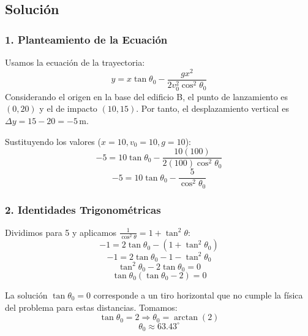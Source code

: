 \documentclass[12pt, a4paper]{article}
\begin{document}
\begin{center}
\end{center}

\subsection*{Solución}

\subsubsection*{1. Planteamiento de la Ecuación}
Usamos la ecuación de la trayectoria:
$$ y = x \tan\theta_0 - \frac{g x^2}{2 v_0^2 \cos^2\theta_0} $$
Considerando el origen en la base del edificio B, el punto de lanzamiento es $(0, 20)$ y el de impacto $(10, 15)$. Por tanto, el desplazamiento vertical es $\Delta y = 15 - 20 = -5\,\text{m}$.

Sustituyendo los valores ($x=10, v_0=10, g=10$):
$$ -5 = 10 \tan\theta_0 - \frac{10(100)}{2(100)\cos^2\theta_0} $$
$$ -5 = 10 \tan\theta_0 - \frac{5}{\cos^2\theta_0} $$

\subsubsection*{2. Identidades Trigonométricas}
Dividimos para 5 y aplicamos $\frac{1}{\cos^2\theta} = 1 + \tan^2\theta$:
$$ -1 = 2\tan\theta_0 - (1 + \tan^2\theta_0) $$
$$ -1 = 2\tan\theta_0 - 1 - \tan^2\theta_0 $$
$$ \tan^2\theta_0 - 2\tan\theta_0 = 0 $$
$$ \tan\theta_0 (\tan\theta_0 - 2) = 0 $$

La solución $\tan\theta_0 = 0$ corresponde a un tiro horizontal que no cumple la física del problema para estas distancias. Tomamos:
$$ \tan\theta_0 = 2 \Rightarrow \theta_0 = \arctan(2) $$
$$ \theta_0 \approx 63.43^\circ $$
\end{document}

